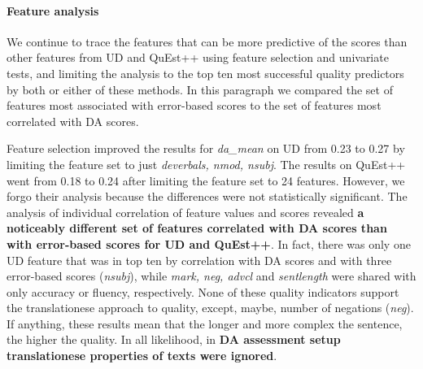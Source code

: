 \paragraph{Feature analysis} 
We continue to trace the features that can be more predictive of the scores than other features from UD and QuEst++ using feature selection and univariate tests, and limiting the analysis to the top ten most successful quality predictors by both or either of these methods.
In this paragraph we compared the set of features most associated with error-based scores to the set of features most correlated with DA scores. 

Feature selection improved the results for \textit{da\_mean} on UD from 0.23 to 0.27 by limiting the feature set to just \textit{deverbals, nmod, nsubj}. The results on QuEst++ went from 0.18 to 0.24 after limiting the feature set to 24 features. However, we forgo their analysis because the differences were not statistically significant.
\label{pg:da_ignores_translationese_feats}
The analysis of individual correlation of feature values and scores revealed \textbf{a noticeably different set of features correlated with DA scores than with error-based scores for UD and QuEst++}. 
In fact, there was only one UD feature that was in top ten by correlation with DA scores and with three error-based scores (\textit{nsubj}), while \textit{mark, neg, advcl} and \textit{sentlength} were shared with only accuracy or fluency, respectively.
None of these quality indicators support the translationese approach to quality, except, maybe, number of negations (\textit{neg}). If anything, these results mean that the longer and more complex the sentence, the higher the quality. In all likelihood, in \textbf{DA assessment setup translationese properties of texts were ignored}.  

